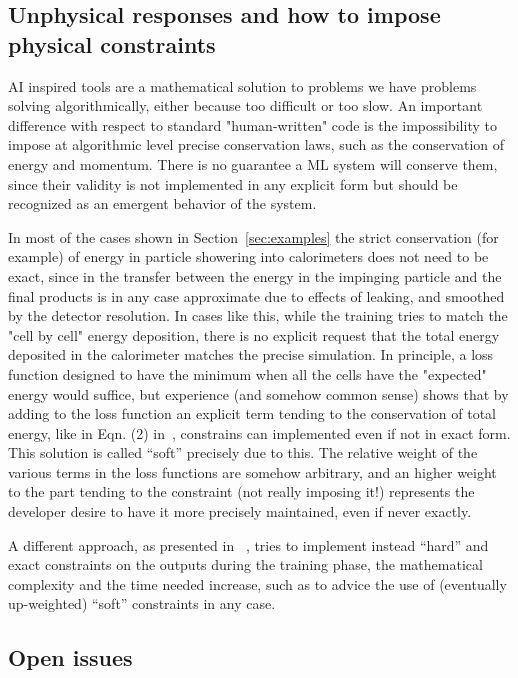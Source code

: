 \subsection{Unphysical responses and how to impose physical constraints}
\label{subsec:physical}
AI inspired tools are a mathematical solution to problems we have problems solving algorithmically, either because too difficult or too slow.
An important difference with respect to standard "human-written" code is the impossibility to impose at algorithmic level precise conservation laws, such as the conservation of energy and momentum.
There is no guarantee a ML system will conserve them, since their validity is not implemented in any explicit form but should be recognized  as an emergent behavior of the system.

In most of the cases shown in Section~\ref{sec:examples} the strict conservation (for example) of energy in particle showering into calorimeters does not need to be exact, since in the transfer  between the energy in the impinging particle and the final products is in any case approximate due to effects of leaking, and smoothed by the detector resolution. In cases like this, while the training tries to  match the "cell by cell" energy deposition, there is no explicit request that the total energy deposited in the calorimeter matches the precise simulation. In principle, a loss function designed to have the minimum when all the cells have the "expected" energy would suffice, but experience (and somehow common sense) shows that by adding to the loss function an explicit term tending to the conservation of total energy, like in Eqn. (2) in~\cite{calogan}, constrains can implemented even if not in exact form. This solution is called ``soft'' precisely due to this.
The relative weight of the various terms in the loss functions are somehow arbitrary, and an higher weight to the part tending to the constraint (not really imposing it!) represents the developer desire to have it more precisely maintained, even if never exactly.

A different approach, as  presented in ~\cite{salzmann}, tries to implement instead ``hard'' and exact constraints on the outputs during the training  phase, the mathematical complexity and the time needed increase, such as to advice the use of (eventually up-weighted)  ``soft'' constraints in any case.


\subsection{Open issues}

